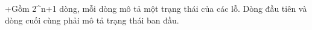+Gồm 2^n+1 dòng, mỗi dòng mô tả một trạng thái của các lỗ. Dòng đầu tiên và dòng cuối cùng phải mô tả trạng thái ban đầu.